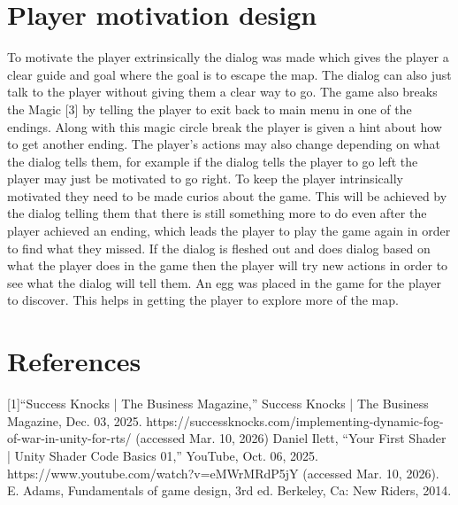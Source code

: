 \documentclass{article}
\begin{document}
\section{Player motivation design}
To motivate the player extrinsically the \gls{dialog} was made which gives the player a clear guide
and goal where the goal is to escape the \gls{map}. The \gls{dialog} can also just talk to the player
without giving them a clear way to go.
\newline
The game also breaks the \gls{Magic} [3] by telling the player to exit back to main menu
in one of the endings. Along with this magic circle break the player is given a hint 
about how to get another ending.
The player's actions may also change depending on what the \gls{dialog} tells them,
for example if the \gls{dialog} tells the player to go left the player may just be
motivated to go right.
\newline
To keep the player intrinsically motivated they need to be made curios about the game. This will
be achieved by the \gls{dialog} telling them that there is still something more to do even after the 
player achieved an ending, which leads the player to play the game again in order to find
what they missed. 
\newline
If the \gls{dialog} is fleshed out and does dialog based
on what the player does in the game then the player will try new actions in order to
see what the \gls{dialog} will tell them.
\newline
An \gls{egg} was placed in the game for the player to discover. This helps in getting
the player to explore more of the \gls{map}.



\section{References}
[1]“Success Knocks | The Business Magazine,” Success Knocks | The Business Magazine, Dec. 03, 2025. https://successknocks.com/implementing-dynamic-fog-of-war-in-unity-for-rts/ (accessed Mar. 10, 2026)
\newline
[2]Daniel Ilett, “Your First Shader | Unity Shader Code Basics 01,” YouTube, Oct. 06, 2025. https://www.youtube.com/watch?v=eMWrMRdP5jY (accessed Mar. 10, 2026).
\newline
[3]E. Adams, Fundamentals of game design, 3rd ed. Berkeley, Ca: New Riders, 2014.


\glsaddall
\printglossary
\end{document}
